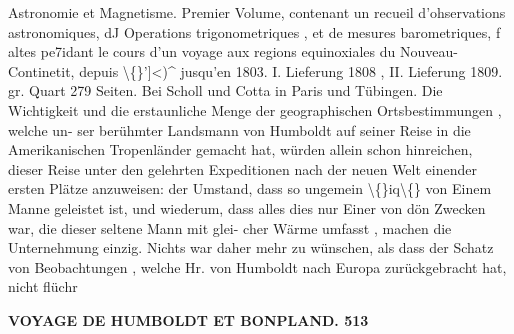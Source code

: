 \documentclass[12pt,a4paper]{article}
\begin{document}
Astronomie  et  Magnetisme.  Premier  Volume, contenant  un  recueil  d'ohservations  astronomiques,  dJ Operations  trigonometriques ,  et  de  mesures  barometriques, f altes  pe7idant  le  cours  d'un  voyage  aux  regions  equinoxiales  du  Nouveau-Continetit,  depuis  \textbackslash\{\}']<)\textasciicircum{}  jusqu'en  1803. I.  Lieferung  1808  ,  II.  Lieferung  1809.     gr.  Quart  279  Seiten.     Bei  Scholl  und  Cotta  in  Paris  und  Tübingen. Die  Wichtigkeit  und  die  erstaunliche  Menge  der  geographischen  Ortsbestimmungen ,  welche  un- ser berühmter  Landsmann  von  Humboldt  auf  seiner  Reise  in  die  Amerikanischen  Tropenländer  gemacht hat,  würden  allein  schon  hinreichen,  dieser  Reise  unter  den  gelehrten  Expeditionen  nach  der  neuen Welt  einender  ersten  Plätze  anzuweisen:  der  Umstand,  dass  so  ungemein  \textbackslash\{\}iq\textbackslash\{\}  von  Einem  Manne  geleistet ist,  und  wiederum,  dass  alles  dies  nur  Einer  von  dön  Zwecken  war,  die  dieser  seltene  Mann  mit  glei- cher Wärme  umfasst ,  machen  die  Unternehmung  einzig.  Nichts  war  daher  mehr  zu  wünschen,  als  dass der  Schatz  von  Beobachtungen ,  welche  Hr.  von  Humboldt  nach  Europa  zurückgebracht  hat,  nicht  flüchr

\vspace{0.5em}


\noindent\textbf{VOYAGE  DE  HUMBOLDT  ET  BONPLAND.  513}
\end{document}
